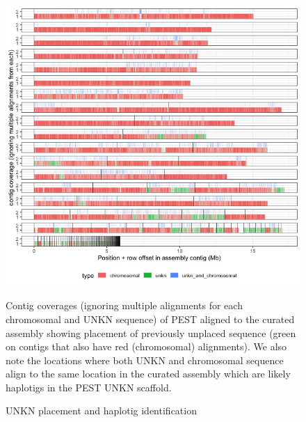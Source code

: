 \begin{figure}[htbp!]

\caption{UNKN placement and haplotig identification}
\label{figure:unknplace}
\begin{centering}
\includegraphics[width=1.0\textwidth]{Unkn_placement_haplotig.jpeg}
\par{Contig coverages (ignoring multiple alignments for each chromosomal and UNKN sequence) of PEST aligned to the curated assembly showing placement of previously unplaced sequence (green on contigs that also have red (chromosomal) alignments). We also note the locations where both UNKN and chromosomal sequence align to the same location in the curated assembly which are likely haplotigs in the PEST UNKN scaffold.}
\end{centering}
\end{figure}


